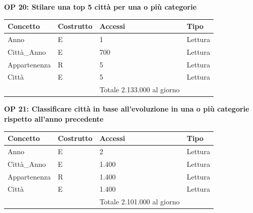 \documentclass[a4paper,12pt]{report}
\begin{document}
            \textbf{OP 20: Stilare una top 5 città per una o più categorie}
        	\begin{table}[h!]
            \centering
             \begin{tabular}{||l l l l||}
             \hline
             Concetto & Costrutto & Accessi & Tipo \\ [0.5ex] 
             \hline\hline
             Anno & E & 1 & Lettura \\ 
             Città\_Anno & E & 700 & Lettura \\ 
             Appartenenza & R & 5 & Lettura \\ 
             Città & E & 5 & Lettura \\ 
             \hline
                &   & Totale  2.133.000 al giorno &  \\ [1ex] 
             \hline
             \end{tabular}
            \end{table}

            \textbf{OP 21: Classificare città in base all’evoluzione in una o più categorie rispetto all’anno precedente}
        	\begin{table}[h!]
            \centering
             \begin{tabular}{||l l l l||}
             \hline
             Concetto & Costrutto & Accessi & Tipo \\ [0.5ex] 
             \hline\hline
             Anno & E & 2 & Lettura \\ 
             Città\_Anno & E & 1.400 & Lettura \\ 
             Appartenenza & R & 1.400 & Lettura \\ 
             Città & E & 1.400 & Lettura \\ 
             \hline
                &   & Totale  2.101.000 al giorno &  \\ [1ex] 
             \hline
             \end{tabular}
            \end{table}
\end{document}
